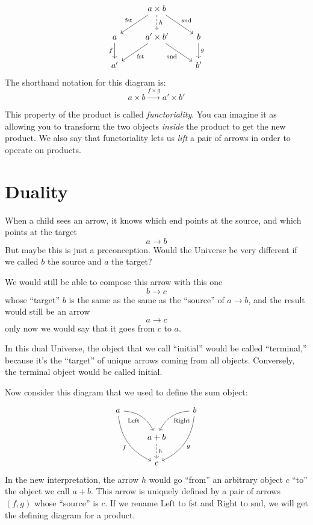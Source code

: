 \documentclass[DaoFP]{subfiles}
\begin{document}
\[
 \begin{tikzcd}
 & a \times b
\arrow[d, dashed, "h"]
 \arrow[dl,  "\text{fst}"']
 \arrow[dr,   "\text{snd}"]
\\
a
\arrow[d, "f"']
&a' \times b'
 \arrow[dl,  "\text{fst}"]
  \arrow[dr,   "\text{snd}"']
& b
\arrow[d, "g"]
\\
a' && b'
 \end{tikzcd}
\]
The shorthand notation for this diagram is:
\[ a \times b \xrightarrow{f \times g} a' \times b' \]

This property of the product is called \emph{functoriality}. You can imagine it as allowing you to transform the two objects \emph{inside} the product to get the new product. We also say that functoriality lets us \emph{lift} a pair of arrows in order to operate on products.

\section{Duality}

When a child sees an arrow, it knows which end points at the source, and which points at the target
\[a \to b \]
But maybe this is just a preconception. Would the Universe be very different if we called $b$ the source and $a$ the target? 

We would still be able to compose this arrow with this one
\[b \to c\]
whose ``target'' $b$ is the same as the same as the ``source'' of $a \to b$, and the result would still be an arrow 
\[a \to c\]
 only now we would say that it goes from $c$ to $a$.

In this dual Universe, the object that we call ``initial'' would be called ``terminal,'' because it's the ``target'' of unique arrows coming from all objects. Conversely, the terminal object would be called initial.

Now consider this diagram that we used to define the sum object:
\[
 \begin{tikzcd}
 a
 \arrow[dr,  bend left, "\text{Left}"']
 \arrow[ddr, bend right, "f"']
 && b
 \arrow[dl, bend right, "\text{Right}"]
 \arrow[ddl, bend left, "g"]
 \\
&a + b
\arrow[d, dashed, "h"]
\\
& c
 \end{tikzcd}
\]
In the new interpretation, the arrow $h$ would go ``from'' an arbitrary object $c$ ``to'' the object we call $a + b$. This arrow is uniquely defined by a pair of arrows $(f, g)$ whose ``source'' is $c$. If we rename $\text{Left}$ to $\text{fst}$ and $\text{Right}$ to $\text{snd}$, we will get  the defining diagram for a product. 
\end{document}

